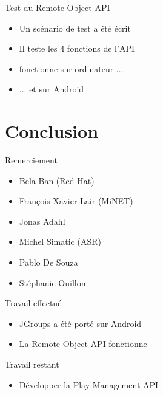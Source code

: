 \documentclass{beamer}
\begin{document}
\begin{frame}
  \begin{block}{Test du Remote Object API}
    \begin{itemize}
      \item Un scénario de test a été écrit
      \item Il teste les 4 fonctions de l'API
      \item fonctionne sur ordinateur ...
      \item ... et sur Android
    \end{itemize}
  \end{block}
\end{frame}

\section{Conclusion}

\begin{frame}
  \tableofcontents[currentsection]
\end{frame}


\begin{frame}
  \begin{block}{Remerciement}
    \begin{itemize}
      \item Bela Ban (Red Hat)
      \item François-Xavier Lair (MiNET)
      \item Jonas Adahl
      \item Michel Simatic (ASR)
      \item Pablo De Souza
      \item Stéphanie Ouillon
    \end{itemize}
  \end{block}
\end{frame}

\begin{frame}
  \begin{block}{Travail effectué}
    \begin{itemize}
      \item JGroups a été porté sur Android
      \item La Remote Object API fonctionne
    \end{itemize}
  \end{block}
  \begin{block}{Travail restant}
    \begin{itemize}
      \item Développer la Play Management API
    \end{itemize}
  \end{block}
\end{frame}
\end{document}
